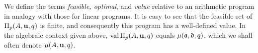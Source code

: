 \documentclass[11pt]{amsart}
\begin{document}

%
%


We define the terms \emph{feasible, optimal}, and \emph{value} relative to an arithmetic program in analogy with those for linear programs.
It is easy to see that the feasible set of $\Pi_p(A,\mathbf{u},q)$ is finite, and consequently this program has a well-defined value.
In the algebraic context given above, $\operatorname{val} \Pi_p(A,\mathbf{u},q)$ equals $\mu(\mathfrak{a},\mathfrak{d},q)$, which we shall often denote $\mu(A,\mathbf{u},q)$.

%
\end{document}

